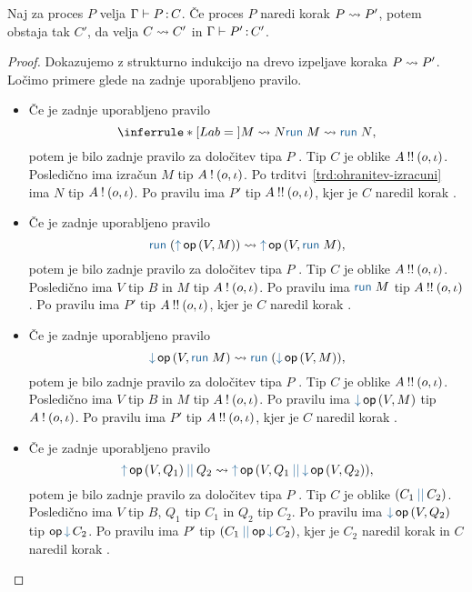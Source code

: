 \begin{izrek}[o ohranitvi]\label{izr:ohranitev}
	Naj za proces $P$ velja $\Gamma \vdash P \mathinner{:} C$. Če proces $P$ naredi korak $P \leadsto P'$, potem obstaja tak $C'$, da velja $C \rightsquigarrow C'$ in $\Gamma \vdash P' \mathinner{:} C'$.
\end{izrek}

\begin{proof}
	Dokazujemo z strukturno indukcijo na drevo izpeljave koraka $P \leadsto P'$.
	Ločimo primere glede na zadnje uporabljeno pravilo.
	
	\begin{itemize}
		\item Če je zadnje uporabljeno pravilo
		$$
		\coopinfer{}{
			M \reduces N
		}{
			\tmrun M \reduces \tmrun N
		},$$
		potem je bilo zadnje pravilo za določitev tipa $P$ . Tip $C$ je oblike $A \mathbin{!!} (o, \iota)$.
		Posledično ima izračun $M$ tip $A \mathbin{!} (o, \iota)$. Po trditvi~\ref{trd:ohranitev-izracuni} ima $N$ tip $A \mathbin{!} (o, \iota)$.
		Po pravilu  ima $P'$ tip $A \mathbin{!!} (o, \iota)$, kjer je $C$ naredil korak .
	
		\item Če je zadnje uporabljeno pravilo
		$$\tmrun {(\tmopout{op}{V}{M})}  \reduces \tmopout{op}{V}{\tmrun M},$$
		potem je bilo zadnje pravilo za določitev tipa $P$ . Tip $C$ je oblike $A \mathbin{!!} (o, \iota)$.
		Posledično ima $V$ tip $B$ in $M$ tip $A \mathbin{!} (o, \iota)$.
		Po pravilu  ima $\tmrun{M}$ tip $A \mathbin{!!} (o, \iota)$.
		Po pravilu  ima $P'$ tip $A \mathbin{!!} (o, \iota)$, kjer je $C$ naredil korak .
		
		\item Če je zadnje uporabljeno pravilo
		$$\tmopin{op}{V}{\tmrun M} \reduces \tmrun {(\tmopin{op}{V}{M})},$$
		potem je bilo zadnje pravilo za določitev tipa $P$ . Tip $C$ je oblike $A \mathbin{!!} (o, \iota)$.
		Posledično ima $V$ tip $B$ in $M$ tip $A \mathbin{!} (o, \iota)$.
		Po pravilu  ima $\tmopin{op}{V}{M}$ tip $A \mathbin{!} (o, \iota)$.
		Po pravilu  ima $P'$ tip $A \mathbin{!!} (o, \iota)$, kjer je $C$ naredil korak .
		
		\item Če je zadnje uporabljeno pravilo
		$$\tmpar{\tmopout{op}{V}{Q_1}}{Q_2} \reduces \tmopout{op}{V}{\tmpar{Q_1}{\tmopin{op}{V}{Q_2}}},$$
		potem je bilo zadnje pravilo za določitev tipa $P$ . Tip $C$ je oblike $\typar{C_1}{C_2}$.
		Posledično ima $V$ tip $B$, $Q_1$ tip $C_1$ in $Q_2$ tip $C_2$.
		Po pravilu  ima $\tmopin{op}{V}{Q_2}$ tip $\opincomp{op}{C_2}$.
		Po pravilu  ima $P'$ tip $\typar{C_1}{\opincomp{op}{C_2}}$, kjer je $C_2$ naredil korak  in $C$ naredil korak .


\end{itemize}
\end{proof}
